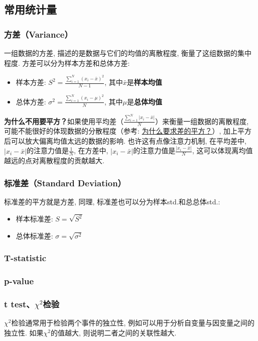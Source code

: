 \subsection{常用统计量}
\subsubsection{方差（Variance）} 一组数据的方差, 描述的是数据与它们的均值的离散程度, 衡量了这组数据的集中程度. 方差可以分为样本方差和总体方差: 
\begin{itemize}
	\item 样本方差: $S^2 = \frac{\sum_{i=1}^N(x_i - \bar{x})^2}{N-1}$, 其中$\bar{x}$是\textbf{样本均值}
	\item 总体方差: $\sigma^2 = \frac{\sum_{i=1}^N(x_i - \mu)^2}{N}$, 其中$\mu$是\textbf{总体均值}
\end{itemize}
\textbf{为什么不用要平方？}如果使用平均差（$\frac{\sum_{i=1}^N |x_i - \bar{x}|}{N}$）来衡量一组数据的离散程度, 可能不能很好的体现数据的分散程度（参考: \href{https://www.shuxuele.com/data/standard-deviation.html#WhySquare}{为什么要求差的平方？}）, 加上平方后可以放大偏离均值太远的数据的影响. 也许这有点像注意力机制, 在平均差中, $|x_i - \bar{x}|$的注意力值是$\frac{1}{N}$, 在方差中, $|x_i - \bar{x}|$的注意力值是$\frac{|x_i - \bar{x}|}{N}$, 这可以体现离均值越远的点对离散程度的贡献越大. 

\subsubsection{标准差（Standard Deviation）} 标准差的平方就是方差, 同理, 标准差也可以分为样本std.和总总体std.: 
\begin{itemize}
	\item 样本标准差: $S = \sqrt{S^2}$
	\item 总体标准差: $\sigma = \sqrt{\sigma^2}$
\end{itemize}

\subsubsection{T-statistic }


\subsubsection{p-value }

\subsubsection{t test、$\chi^2$检验}
$\chi^2$检验通常用于检验两个事件的独立性, 例如可以用于分析自变量与因变量之间的独立性. 如果$\chi^2$的值越大, 则说明二者之间的关联性越大. 

